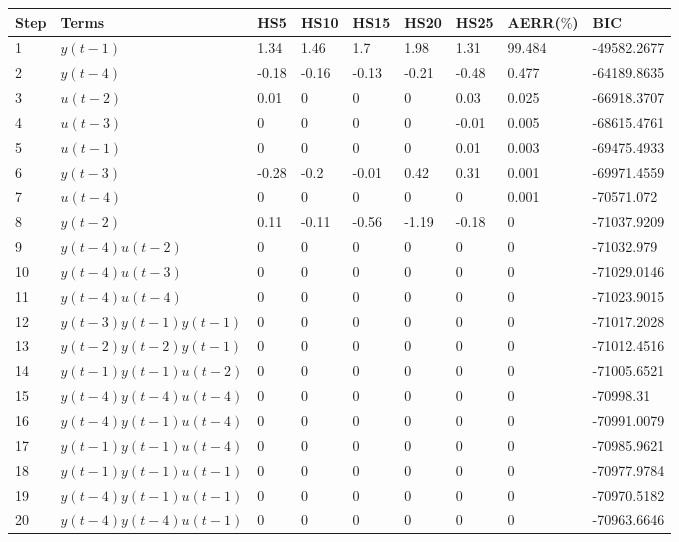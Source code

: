 \begin{tabular}{lllllllll}
Step & Terms & HS5 & HS10 & HS15 & HS20 & HS25 & AERR($\%$) & BIC \\ 
\hline 
1 & $y(t-1)$ & 1.34 & 1.46 & 1.7 & 1.98 & 1.31 & 99.484 & -49582.2677 \\ 
2 & $y(t-4)$ & -0.18 & -0.16 & -0.13 & -0.21 & -0.48 & 0.477 & -64189.8635 \\ 
3 & $u(t-2)$ & 0.01 & 0 & 0 & 0 & 0.03 & 0.025 & -66918.3707 \\ 
4 & $u(t-3)$ & 0 & 0 & 0 & 0 & -0.01 & 0.005 & -68615.4761 \\ 
5 & $u(t-1)$ & 0 & 0 & 0 & 0 & 0.01 & 0.003 & -69475.4933 \\ 
6 & $y(t-3)$ & -0.28 & -0.2 & -0.01 & 0.42 & 0.31 & 0.001 & -69971.4559 \\ 
7 & $u(t-4)$ & 0 & 0 & 0 & 0 & 0 & 0.001 & -70571.072 \\ 
8 & $y(t-2)$ & 0.11 & -0.11 & -0.56 & -1.19 & -0.18 & 0 & -71037.9209 \\ 
9 & $y(t-4)u(t-2)$ & 0 & 0 & 0 & 0 & 0 & 0 & -71032.979 \\ 
10 & $y(t-4)u(t-3)$ & 0 & 0 & 0 & 0 & 0 & 0 & -71029.0146 \\ 
11 & $y(t-4)u(t-4)$ & 0 & 0 & 0 & 0 & 0 & 0 & -71023.9015 \\ 
12 & $y(t-3)y(t-1)y(t-1)$ & 0 & 0 & 0 & 0 & 0 & 0 & -71017.2028 \\ 
13 & $y(t-2)y(t-2)y(t-1)$ & 0 & 0 & 0 & 0 & 0 & 0 & -71012.4516 \\ 
14 & $y(t-1)y(t-1)u(t-2)$ & 0 & 0 & 0 & 0 & 0 & 0 & -71005.6521 \\ 
15 & $y(t-4)y(t-4)u(t-4)$ & 0 & 0 & 0 & 0 & 0 & 0 & -70998.31 \\ 
16 & $y(t-4)y(t-1)u(t-4)$ & 0 & 0 & 0 & 0 & 0 & 0 & -70991.0079 \\ 
17 & $y(t-1)y(t-1)u(t-4)$ & 0 & 0 & 0 & 0 & 0 & 0 & -70985.9621 \\ 
18 & $y(t-1)y(t-1)u(t-1)$ & 0 & 0 & 0 & 0 & 0 & 0 & -70977.9784 \\ 
19 & $y(t-4)y(t-1)u(t-1)$ & 0 & 0 & 0 & 0 & 0 & 0 & -70970.5182 \\ 
20 & $y(t-4)y(t-4)u(t-1)$ & 0 & 0 & 0 & 0 & 0 & 0 & -70963.6646 \\ 
\hline 
\end{tabular}